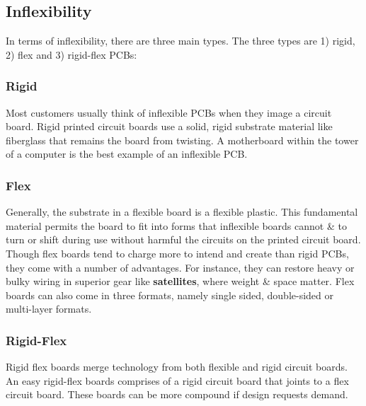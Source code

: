 \documentclass[final]{cubedoc}
\begin{document}
	\subsection{Inflexibility}
	In terms of inflexibility, there are three main types. The three types are 1) rigid, 2) flex and 3) rigid-flex PCBs:
	
	\subsubsection{Rigid}
	Most customers usually think of inflexible PCBs when they image a circuit board. Rigid printed circuit boards use a solid, rigid substrate material like fiberglass that remains the board from twisting. A motherboard within the tower of a computer is the best example of an inflexible PCB.
	
	\subsubsection{Flex}
	Generally, the substrate in a flexible board is a flexible plastic. This fundamental material permits the board to fit into forms that inflexible boards cannot & to turn or shift during use without harmful the circuits on the printed circuit board. Though flex boards tend to charge more to intend and create than rigid PCBs, they come with a number of advantages. For instance, they can restore heavy or bulky wiring in superior gear like \textbf{satellites}, where weight & space matter. Flex boards can also come in three formats, namely single sided, double-sided or multi-layer formats.
	
	\subsubsection{Rigid-Flex}
	Rigid flex boards merge technology from both flexible and rigid circuit boards. An easy rigid-flex boards comprises of a rigid circuit board that joints to a flex circuit board. These boards can be more compound if design requests demand.
	
\end{document}
